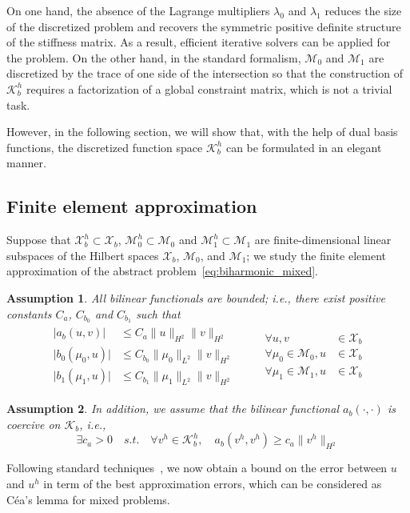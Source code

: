 \documentclass[preprint,12pt]{elsarticle}
\newtheorem{assumption}{Assumption}
\begin{document}
On one hand, the absence of the Lagrange multipliers $\lambda_0$ and $\lambda_1$ reduces the size of the discretized problem and recovers the symmetric positive definite structure of the stiffness matrix. As a result, efficient iterative solvers can be applied for the problem. On the other hand, in the standard formalism, $\mathcal{M}_0$ and $\mathcal{M}_1$ are discretized by the trace of one side of the intersection so that the construction of $\mathcal{K}_b^h$ requires a factorization of a global constraint matrix, which is not a trivial task. \par
However, in the following section, we will show that, with the help of dual basis functions, the discretized function space $\mathcal{K}_b^h$ can be formulated in an elegant manner.

\subsection{Finite element approximation}
Suppose that $\mathcal{X}_b^h\subset{\mathcal{X}_b}$, $\mathcal{M}_0^h\subset{\mathcal{M}_0}$ and $\mathcal{M}_1^h\subset{\mathcal{M}_1}$ are finite-dimensional linear subspaces of the Hilbert spaces $\mathcal{X}_b$, $\mathcal{M}_0$, and $\mathcal{M}_1$; we study the finite element approximation of the abstract problem~\eqref{eq:biharmonic_mixed}.
\begin{assumption}
    All bilinear functionals are bounded; i.e.,  there exist positive constants $C_a$, $C_{b_0}$ and $C_{b_1}$ such that
    \begin{align}
        \begin{split}
        \vert{a_b{(u,v)}}\vert&\leq{C_a\|u\|_{H^2}\|v\|_{H^2}}\\
        \vert{b_0{(\mu_0,u)}}\vert&\leq{C_{b_0}\|\mu_0\|_{L^2}\|v\|_{H^2}}\\
        \vert{b_1{(\mu_1,u)}}\vert&\leq{C_{b_1}\|\mu_1\|_{L^2}\|v\|_{H^2}}
        \end{split}
        \quad\quad
        \begin{split}
            \forall{u,v}&\in{\mathcal{X}_b}\\
            \forall{\mu_0}\in\mathcal{M}_0, {u}&\in{\mathcal{X}_b}\\
            \forall{\mu_1}\in\mathcal{M}_1, {u}&\in{\mathcal{X}_b}
        \end{split}
    \end{align} 
\end{assumption}

\begin{assumption}
    In addition, we assume that the bilinear functional $a_b(\cdot,\cdot)$ is coercive on $\mathcal{K}_b$, i.e.,
    \begin{equation}
        \exists{c_a>0} \quad\textit{s.t.}\quad\forall{v^h}\in\mathcal{K}_b^h,\quad a_b(v^h,v^h)\geq{c_a\|{v^h}\|_{H^2}}
    \end{equation}
\end{assumption}
Following standard techniques~\cite{brenner_mathematical_2007}, we now obtain a bound on the error between $u$ and $u^h$ in term of the best approximation errors, which can be considered as C\'ea's lemma for mixed problems.
\end{document}
